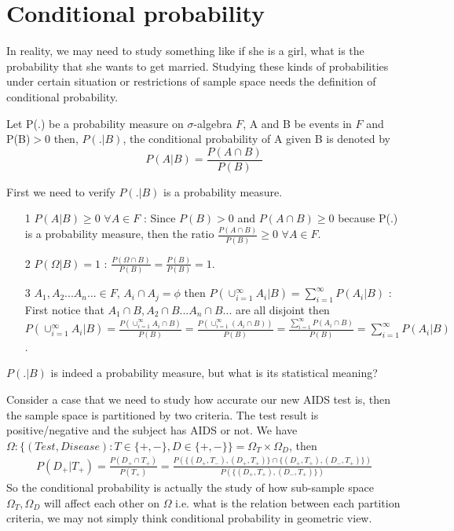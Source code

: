 \documentclass[11pt]{report}
\begin{document}
\section{Conditional probability}
In reality, we may need to study something like if she is a girl, what is the probability that she wants to get married. Studying these kinds of probabilities under certain situation or restrictions of sample space needs the definition of conditional probability.
\begin{theorem}
Let P(.) be a probability measure on $\sigma$-algebra $F$, A and B be events in $F$ and P(B)$>$0 then, $P(.|B)$, the conditional probability of A given B is denoted by  
$$P(A|B)=\frac{P(A\cap B)}{P(B)}$$
\end{theorem}
First we need to verify $P(.|B)$ is a probability measure.
\begin{enumerate}
\item[1] $P(A|B)\geq 0$  $\forall A\in F$ : Since $P(B)>0$ and $P(A\cap B)\geq 0$ because P(.) is a probability measure, then the ratio  $\frac{P(A\cap B)}{P(B)}\geq 0$ $\forall A\in F$.
\item[2] $P(\Omega|B)=1$ : $\frac{P(\Omega\cap B)}{P(B)}=\frac{P(B)}{P(B)}=1$.
\item[3] $A_1,A_2...A_n...\in F$, $A_i\cap A_j=\phi$ then $P(\cup_{i=1}^\infty A_i|B)=\sum_{i=1}^{\infty}P(A_i|B)$ : First notice that $A_1\cap B,A_2\cap B...A_n\cap B...$ are all disjoint then $P(\cup_{i=1}^\infty A_i|B)=\frac{P(\cup_{i=1}^\infty A_i\cap B)}{P(B)}=\frac{P(\cup_{i=1}^\infty (A_i\cap B))}{P(B)}=\frac{\sum_{i=1}^{\infty}P(A_i\cap B)}{P(B)}=\sum_{i=1}^{\infty}P(A_i|B)$.
\end{enumerate}
$P(.|B)$ is indeed a probability measure, but what is its statistical meaning?
\begin{example} 
Consider a case that we need to study how accurate our new AIDS test is, then the sample space is partitioned by two criteria. The test result is positive/negative and the subject has AIDS or not. We have  $\Omega:\{(Test,Disease):T\in\{+,-\},D\in\{+,-\}\}=\Omega_T\times\Omega_D$, then
\begin{align*} 
P(D_+|T_+)=\frac{P(D_+\cap T_+)}{P(T_+)}=\frac{P(\{(D_+,T_-),(D_+,T_+)\}\cap\{(D_+,T_+),(D_-,T_+)\})}{P(\{(D_+,T_+),(D_-,T_+)\})}
\end{align*} 
So the conditional probability is actually the study of how sub-sample space $\Omega_T,\Omega_D$ will affect each other on $\Omega$ i.e. what is the relation between each partition criteria, we may not simply think conditional probability in geometric view.   
\end{example}
\end{document}
